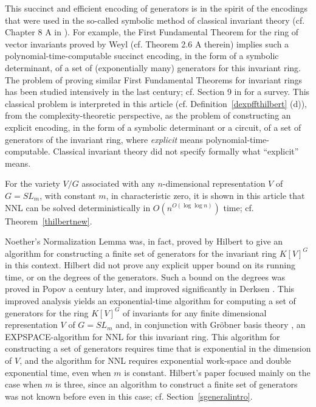 \documentclass[11pt]{article}
\begin{document}
This succinct and efficient encoding of generators 
is in the spirit of the 
encodings that were  used in the so-called symbolic method of classical invariant theory (cf. Chapter 8 A in \cite{weyl}).
For example, the First Fundamental Theorem  for the ring of vector invariants 
proved by Weyl \cite{weyl} (cf. Theorem 2.6 A therein) 
implies  such a polynomial-time-computable succinct encoding, in the form of a symbolic 
determinant, of a set of (exponentially
many) generators for this
invariant ring. The problem of proving similar  First Fundamental Theorems
for invariant rings
has been  studied intensively in the last century; cf. Section 9
in \cite{popovbook} for a survey. 
This classical problem 
is interpreted in this article (cf. Definition~\ref{dexpffthilbert} (d)), from the complexity-theoretic perspective, as 
the problem of constructing an explicit 
encoding, in the form of a symbolic determinant or  a circuit, of a set of generators
of the invariant ring, where  {\em explicit} means polynomial-time-computable.
Classical invariant theory
did not  specify formally  what   ``explicit'' means. 

For the variety $V/G$
associated with  any  $n$-dimensional representation $V$ 
of $G=SL_m$, with constant $m$, in characteristic zero,  it is shown in this article that NNL can be solved deterministically 
in $O(n^{O(\log \log n)})$ time; cf. Theorem~\ref{thilbertnew}.


Noether's Normalization Lemma  was, in fact,  proved by Hilbert
\cite{hilbert} to give an algorithm 
for  constructing a finite set of generators 
for  the invariant ring $K[V]^G$ in this context.
Hilbert did  not prove any explicit upper bound on its  running time, 
or on the degrees of the generators.
Such a bound on the degrees 
was proved in  Popov \cite{popov} a century later,
and improved significantly in Derksen \cite{derksen}.
This improved analysis yields  an  exponential-time algorithm for computing a set of generators 
for the ring $K[V]^G$ of invariants 
for  any finite dimensional representation $V$ of $G=SL_m$ and, in conjunction with Gr\"obner basis theory
\cite{mayr2},  an  EXPSPACE-algorithm for  NNL for this invariant ring.
This algorithm for constructing
a set of generators requires  time that is exponential in the dimension of $V$, 
and the algorithm for NNL requires  exponential work-space 
and double exponential time,  even when  $m$  is constant.
Hilbert's paper focused mainly on  the case when $m$  is three, since
an algorithm to construct a finite set of generators
was not known before even in this case; cf. Section~\ref{sgeneralintro}.
\end{document}
